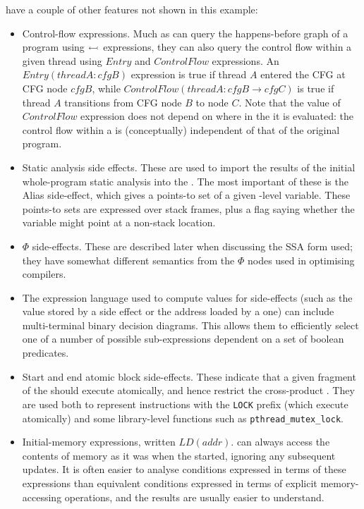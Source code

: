 \STateMachines have a couple of other features not shown in this
example:

\begin{itemize}
\item
  Control-flow expressions.  Much as \StateMachines can query the
  happens-before graph of a program using $\leftarrowtail$
  expressions, they can also query the control flow within a given
  thread using $Entry$ and $ControlFlow$ expressions.  An
  $Entry(threadA:cfgB)$ expression is true if thread $A$ entered the
  CFG at CFG node $cfgB$, while $ControlFlow(threadA:cfgB{\rightarrow}cfgC)$ is
  true if thread $A$ transitions from CFG node $B$ to node $C$.  Note
  that the value of $ControlFlow$ expression does not depend on where
  in the {\StateMachine} it is evaluated: the control flow within a
  {\StateMachine} is (conceptually) independent of that of the original
  program.
\item
  Static analysis side effects.  These are used to import the results
  of the initial whole-program static analysis into the \StateMachine.
  The most important of these is the Alias side-effect, which gives a
  points-to set of a given \StateMachine-level variable.  These
  points-to sets are expressed over stack frames, plus a flag saying
  whether the variable might point at a non-stack location.
\item
  $\Phi$ side-effects.  These are described later when discussing the
  SSA form used; they have somewhat different semantics from the
  $\Phi$ nodes used in optimising compilers.
\item
  The expression language used to compute values for side-effects
  (such as the value stored by a  side effect or the
  address loaded by a  one) can include multi-terminal
  binary decision diagrams.
  This allows them to efficiently select one of a number of possible
  sub-expressions dependent on a set of boolean predicates.
\item
  Start and end atomic block side-effects.  These indicate that a
  given fragment of the {\StateMachine} should execute atomically, and
  hence restrict the cross-product {\StateMachine}.  They are used both
  to represent instructions with the \verb|LOCK| prefix (which execute
  atomically) and some library-level functions such as
  \verb|pthread_mutex_lock|.
\item
  Initial-memory expressions, written $LD(addr)$.  {\STateMachines}
  can always access the contents of memory as it was when the
  {\StateMachine} started, ignoring any subsequent updates.  It is
  often easier to analyse conditions expressed in terms of these
  expressions than equivalent conditions expressed in terms of
  explicit memory-accessing operations, and the results are usually
  easier to understand.


\end{itemize}

